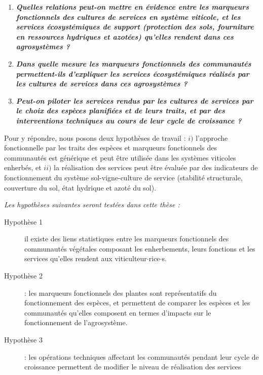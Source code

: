\begin{enumerate}[leftmargin=*]
\item \textbf{\textit{Quelles relations peut-on mettre en évidence entre les marqueurs fonctionnels des cultures de services en système viticole, et les services écosystémiques de support (protection des sols, fourniture en ressources hydriques et azotées) qu'elles rendent dans ces agrosystèmes ?}}
\item \textbf{\textit{Dans quelle mesure les marqueurs fonctionnels des communautés permettent-ils d'expliquer les services écosystémiques réalisés par les cultures de services dans ces agrosystèmes ?}}
\item \textbf{\textit{Peut-on piloter les services rendus par les cultures de services par le choix des espèces planifiées et de leurs traits, et par des interventions techniques au cours de leur cycle de croissance ?}}
\end{enumerate}

Pour y répondre, nous posons deux hypothèses de travail : $i)$ l'approche fonctionnelle par les traits des espèces et marqueurs fonctionnels des communautés est générique et peut être utilisée dans les systèmes viticoles enherbés, et $ii)$ la réalisation des services peut être évaluée par des indicateurs de fonctionnement du système sol-vigne-culture de service (stabilité structurale, couverture du sol, état hydrique et azoté du sol). 

\medskip

\noindent \textit{Les hypothèses suivantes seront testées dans cette thèse :}

\begin{description}
\item[Hypothèse 1]\label{c1:h} il existe des liens statistiques entre les marqueurs fonctionnels des communautés végétales composant les enherbements, leurs fonctions et les services qu'elles rendent aux viticulteur$\cdot$rice$\cdot$s.
\item[Hypothèse 2] : les marqueurs fonctionnels des plantes sont représentatifs du fonctionnement des espèces, et permettent de comparer les espèces et les communautés qu'elles composent en termes d'impacts sur le fonctionnement de l'agrosystème.
\item[Hypothèse 3] : les opérations techniques affectant les communautés pendant leur cycle de croissance permettent de modifier le niveau de réalisation des services 

\end{description}

